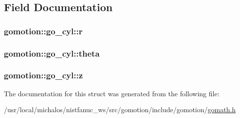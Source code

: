 \subsection{Field Documentation}
\hypertarget{structgomotion_1_1go__cyl_a01ff0e161b92bff5b5742808fc0f5f02}{
\subsubsection[{r}]{ gomotion\-::go\-\_\-cyl\-::r}}\label{structgomotion_1_1go__cyl_a01ff0e161b92bff5b5742808fc0f5f02}
\hypertarget{structgomotion_1_1go__cyl_a7def1d9e1fea7c520be46ee08c134fd6}{
\subsubsection[{theta}]{ gomotion\-::go\-\_\-cyl\-::theta}}\label{structgomotion_1_1go__cyl_a7def1d9e1fea7c520be46ee08c134fd6}
\hypertarget{structgomotion_1_1go__cyl_ac2220c8506540fbbac2e17a8ee72bb45}{
\subsubsection[{z}]{ gomotion\-::go\-\_\-cyl\-::z}}\label{structgomotion_1_1go__cyl_ac2220c8506540fbbac2e17a8ee72bb45}


The documentation for this struct was generated from the following file\-:\begin{DoxyCompactItemize}
\item 
/usr/local/michalos/nistfanuc\-\_\-ws/src/gomotion/include/gomotion/\hyperlink{gomath_8h}{gomath.\-h}\end{DoxyCompactItemize}
